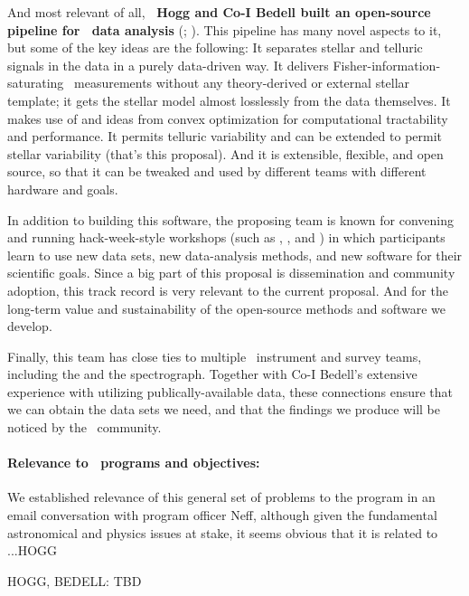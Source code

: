 \documentclass[12pt, letterpaper]{article}
\begin{document}
And most relevant of all, \textbf{\PI\ Hogg and Co-I Bedell built an open-source
pipeline for \EPRV\ data analysis} (\wobble; \citealt{Bedell2019}).
This pipeline has many novel aspects to it, but some of the key ideas
are the following: 
It separates stellar and telluric signals in the data in a purely
data-driven way.
It delivers Fisher-information-saturating \RV\ measurements without any
theory-derived or external stellar template; it gets the stellar model
almost losslessly from the data themselves.
It makes use of  and ideas from convex optimization
for computational tractability and performance.
It permits telluric variability and can be extended to permit stellar
variability (that's this proposal).
And it is extensible, flexible, and open source, so that it can be
tweaked and used by different teams with different hardware and goals.

In addition to building this software, the proposing team is known for
convening and running hack-week-style workshops (such as , , and ) in which participants learn to use new data sets, new
data-analysis methods, and new software for their scientific goals.
Since a big part of this proposal is dissemination and community adoption,
this track record is very relevant to the current proposal.
And for the long-term value and sustainability of the open-source methods
and software we develop.

Finally, this team has close ties to multiple \EPRV\ instrument and survey
teams, including the  and the 
spectrograph. Together with Co-I Bedell's extensive experience with utilizing 
publically-available  data, these connections ensure that 
we can obtain the data sets we need, and that the findings we produce will 
be noticed by the \EPRV\ community.

\paragraph{Relevance to \NSF\ programs and objectives:}

We established relevance of this general set of problems to the  program
in an email conversation with program officer Neff, although given the fundamental
astronomical and physics issues at stake, it seems obvious that it is related to
...HOGG 

HOGG, BEDELL: TBD
\end{document}
